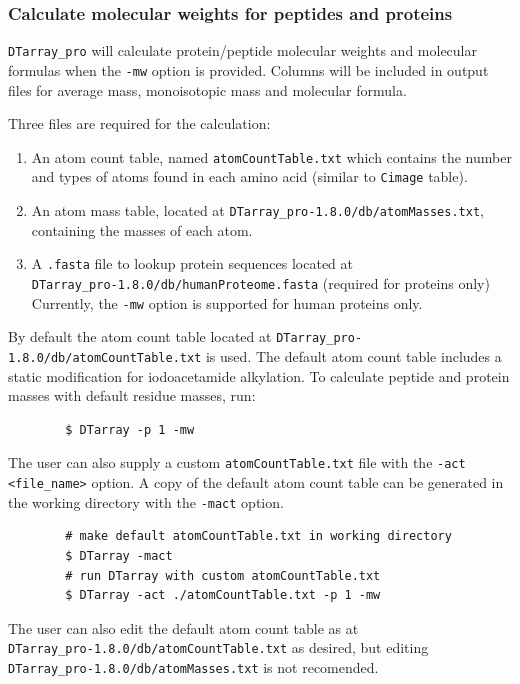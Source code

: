 \documentclass[12pt]{article}
\newcommand{\VERSION}{1.8.0}
\begin{document}
	\subsubsection{Calculate molecular weights for peptides and proteins}
	
	\texttt{DTarray\_pro} will calculate protein/peptide molecular weights and  molecular  formulas when the \texttt{-mw} option is provided. Columns  will  be  included in output files for average mass, monoisotopic mass and molecular formula.  
	
	\bigskip
	\noindent
	Three files are required for the calculation:
	
	\begin{enumerate}
		\item  An atom count table, named \texttt{atomCountTable.txt} which contains the number and types of atoms found in each amino acid (similar to \texttt{Cimage} table).
		
		\item An atom mass table, located at \texttt{DTarray\_pro-\VERSION/db/atomMasses.txt}, containing the masses of each atom.  
		
		\item A \texttt{.fasta} file to lookup protein sequences located at \\ \texttt{DTarray\_pro-\VERSION/db/humanProteome.fasta} (required for proteins only) Currently, the \texttt{-mw} option is supported for human proteins only.
	\end{enumerate}
	
	\noindent
	By default the atom count table located at \texttt{DTarray\_pro-\VERSION/db/atomCountTable.txt} is used. The default atom count table includes a static modification for iodoacetamide alkylation.  To calculate peptide and protein masses with default residue masses, run:
	
	\begin{lstlisting}
		$ DTarray -p 1 -mw
	\end{lstlisting}
	
	The  user  can  also supply a custom \texttt{atomCountTable.txt} file with the \texttt{-act <file\_name>} option. A copy of the default atom count table can be generated in the working directory with the \texttt{-mact} option.  
	
	\begin{lstlisting}
		# make default atomCountTable.txt in working directory
		$ DTarray -mact
		# run DTarray with custom atomCountTable.txt
		$ DTarray -act ./atomCountTable.txt -p 1 -mw
	\end{lstlisting}
	
	\noindent
	The user can also edit the default atom count table as at \\ \texttt{DTarray\_pro-\VERSION/db/atomCountTable.txt} as desired, but editing \\ \texttt{DTarray\_pro-\VERSION/db/atomMasses.txt} is not recomended.
	
\end{document}
